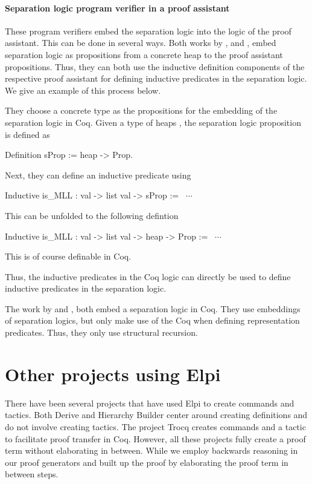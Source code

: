 \documentclass[thesis.tex]{subfiles}
\begin{document}
\paragraph{Separation logic program verifier in a proof assistant}
These program verifiers embed the separation logic into the logic of the proof assistant. This can be done in several ways. Both works by  \cite{appelTacticsSeparationLogic2006}, and  \cite{rouvoetIntrinsicallyTypedCompilation2021}, embed separation logic as propositions from a concrete heap to the proof assistant propositions. Thus, they can both use the inductive definition components of the respective proof assistant for defining inductive predicates in the separation logic. We give an example of this process below.
\begin{example}{}{}
  They choose a concrete type as the propositions for the embedding of the separation logic in Coq. Given a type of heaps , the separation logic proposition is defined as
  \begin{coqcode}
    Definition sProp := heap -> Prop.
  \end{coqcode}
  Next, they can define an inductive predicate using 
  \begin{coqcode}
    Inductive is_MLL : val -> list val -> sProp := ~$\cdots$~
  \end{coqcode}
  This can be unfolded to the following defintion
  \begin{coqcode}
    Inductive is_MLL : val -> list val -> heap -> Prop := ~$\cdots$~
  \end{coqcode}
  This is of course definable in Coq.

  \hspace{.5cm} Thus, the inductive predicates in the Coq logic can directly be used to define inductive predicates in the separation logic.
\end{example}

The work by  \cite{chlipalaMostlyautomatedVerificationLowlevel2011} and  \cite{bengtsonCharge2012}, both embed a separation logic in Coq. They use embeddings of separation logics, but only make use of the Coq  when defining representation predicates. Thus, they only use structural recursion.

\section{Other projects using Elpi}\label{sec:OtherElpiProj}
There have been several projects that have used Elpi to create commands and tactics. Both Derive \cite{tassiDerivingProvedEquality2019} and Hierarchy Builder \cite{cohenHierarchyBuilderAlgebraic2020} center around creating definitions and do not involve creating tactics. The project Trocq \cite{cohenTrocqProofTransfer2024} creates commands and a tactic to facilitate proof transfer in Coq. However, all these projects fully create a proof term without elaborating in between. While we employ backwards reasoning in our proof generators and built up the proof by elaborating the proof term in between steps.
\end{document}

